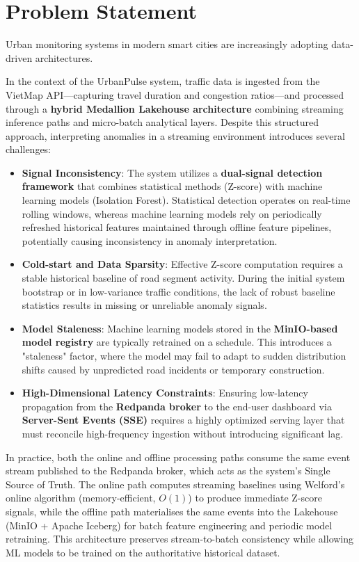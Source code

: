 \section{Problem Statement}

Urban monitoring systems in modern smart cities are increasingly adopting data-driven architectures.

In the context of the UrbanPulse system, traffic data is ingested from the VietMap API—capturing travel duration and congestion ratios—and processed through a \textbf{hybrid Medallion Lakehouse architecture} combining streaming inference paths and micro-batch analytical layers. Despite this structured approach, interpreting anomalies in a streaming environment introduces several challenges:

\begin{itemize}
\item \textbf{Signal Inconsistency}: The system utilizes a \textbf{dual-signal detection framework} that combines statistical methods (Z-score) with machine learning models (Isolation Forest). Statistical detection operates on real-time rolling windows, whereas machine learning models rely on periodically refreshed historical features maintained through offline feature pipelines, potentially causing inconsistency in anomaly interpretation.
\item \textbf{Cold-start and Data Sparsity}: Effective Z-score computation requires a stable historical baseline of road segment activity. During the initial system bootstrap or in low-variance traffic conditions, the lack of robust baseline statistics results in missing or unreliable anomaly signals.
\item \textbf{Model Staleness}: Machine learning models stored in the \textbf{MinIO-based model registry} are typically retrained on a schedule. This introduces a "staleness" factor, where the model may fail to adapt to sudden distribution shifts caused by unpredicted road incidents or temporary construction.
\item \textbf{High-Dimensional Latency Constraints}: Ensuring low-latency propagation from the \textbf{Redpanda broker} to the end-user dashboard via \textbf{Server-Sent Events (SSE)} requires a highly optimized serving layer that must reconcile high-frequency ingestion without introducing significant lag.
\end{itemize}

In practice, both the online and offline processing paths consume the same event stream published to the Redpanda broker, which acts as the system's Single Source of Truth. The online path computes streaming baselines using Welford's online algorithm (memory-efficient, $O(1)$) to produce immediate Z-score signals, while the offline path materialises the same events into the Lakehouse (MinIO + Apache Iceberg) for batch feature engineering and periodic model retraining. This architecture preserves stream-to-batch consistency while allowing ML models to be trained on the authoritative historical dataset.

